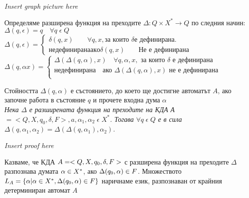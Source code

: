 \documentclass[11pt]{article} %
\begin{document}
\centerline{\emph{Insert graph picture here}}  
 Определяме разширена функция на преходите $\Delta : Q \times X^{*} \to Q$ по следния начин: \\

$\Delta(q, \epsilon) = q \quad \forall q \; \epsilon \; Q$ \\
$\Delta(q, \epsilon) = 
	\begin{cases}
		\delta(q, x) \quad \quad \forall q, x, \text{за които } \delta \text{е дефинирана.}\\
		недефинирана ако \delta(q, x) \quad \quad \text{Не е дефинирана}   
    \end{cases}$\\
$\Delta(q, \alpha x) = 
	\begin{cases}
		\Delta(\Delta(q, \alpha), x) \quad \forall q, \alpha, x, \text{ за които } \delta \text{ е дефинирана} \\
		\text{недефинирана} \quad \text{ако } \Delta(\Delta(q, \alpha), x) \text{ не е дефинирана} \\   
	\end{cases}$ \par

Стойността $\Delta(q, \alpha)$ е състоянието, до което ще достигне автоматът $A$, ако започне работа в състояние $q$ и прочете входна дума $\alpha$\\

 \emph{Нека $\Delta$ е разширената функция на преходите на КДА А 
$ = < Q, X, q_{0}, \delta, F >, a, \alpha_{1}, \alpha_{2} \; \epsilon \; X^{*}$. Тогава $\forall q \; \epsilon \; Q$ е в сила 
$\Delta(q, \alpha_{1}, \alpha_{2}) = \Delta(\Delta(q, \alpha_{1}), \alpha_{2})$.} \\

\centerline{\emph{Insert proof here}}

 Казваме, че КДА 
$A = <Q, X, q_{0}, \delta, F> $ с разширена функция на преходите 
$\Delta$ разпознава думата 
$\alpha \in X^{*}$, ако $\Delta(q_{0}, \alpha) \in F$. Множеството 
$L_{A} = \{\alpha| \alpha \in X^{*}, \Delta(q_{0}, \alpha) \in F\}$ наричнаме език, разпознаван от крайния детерминиран автомат $A$ \par
\end{document}
